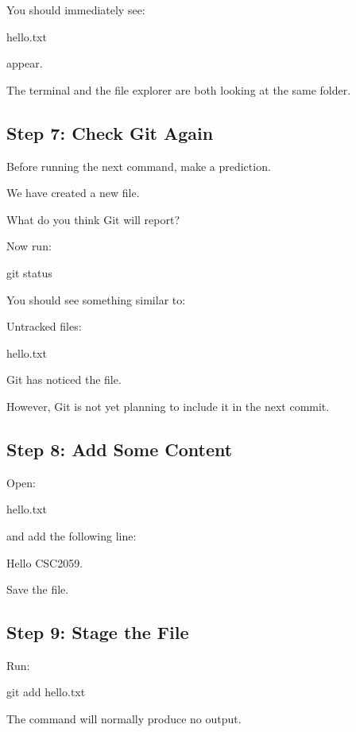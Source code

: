 \documentclass{csc2059practical}
\begin{document}
You should immediately see:

\begin{terminalplain}
hello.txt
\end{terminalplain}
appear.

The terminal and the file explorer are both looking at the same folder.

\subsection{Step 7: Check Git Again}
Before running the next command, make a prediction.

We have created a new file.

What do you think Git will report?

Now run:

\begin{terminalplain}
git status
\end{terminalplain}
You should see something similar to:

\begin{terminalplain}
Untracked files:

\hspace{1cm}\textcolor{GitRed}{hello.txt}
\end{terminalplain}
Git has noticed the file.

However, Git is not yet planning to include it in the next commit.

\subsection{Step 8: Add Some Content}
Open:

\begin{terminalplain}
hello.txt
\end{terminalplain}
and add the following line:

\begin{terminalplain}
Hello CSC2059.
\end{terminalplain}
Save the file.

\subsection{Step 9: Stage the File}
Run:

\begin{terminalplain}
git add hello.txt
\end{terminalplain}
The command will normally produce no output.
\end{document}
